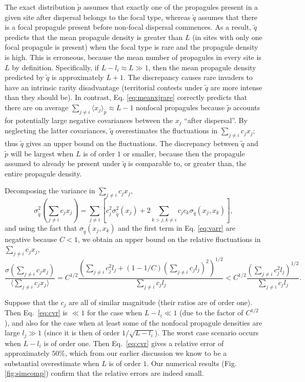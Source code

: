 \documentclass[12pt]{article}
\begin{document}
The exact distribution $\tilde{p}$ assumes that exactly one of the  propagules present in a given site after dispersal belongs to the focal type, whereas $\tilde{q}$ assumes that there is a focal propagule present before non-focal dispersal commences. As a result, $\tilde{q}$ predicts that the mean propagule density is greater than $L$ (in sites with only one focal propagule is present) when the focal type is rare and the propagule density is high. This is erroneous, because the mean number of propagules in every site is $L$ by definition. Specifically, if $L-l_i \approx L\gg 1$, then the mean propagule density predicted by $\tilde{q}$ is approximately $L+1$. The discrepancy causes rare invaders to have an intrinsic rarity disadvantage (territorial contests under $\tilde{q}$ are more intense than they should be). In contrast, Eq. \eqref{eq:meanxjrare} correctly predicts that there are on average $\sum_{j\neq i}\langle x_j \rangle_{\tilde{p}}\approx L-1$ nonfocal propagules because $\tilde{p}$ accounts for potentially large negative covariances between the $x_j$ ``after dispersal''. By neglecting the latter covariances, $\tilde{q}$ overestimates the fluctuations in $\sum_{j\neq i} c_j x_j$; thus $\tilde{q}$ gives an upper bound on the fluctuations. The discrepancy between $\tilde{q}$ and $\tilde{p}$ will be largest when $L$ is of order $1$ or smaller, because then the propagule assumed to already be present under $\tilde{q}$ is comparable to, or greater than, the entire propagule density. 

Decomposing the variance in $\sum_{j\neq i} c_j x_j$,
\begin{equation}
\sigma_{\tilde{q}}^2(\sum_{j\neq i} c_j x_j)=\sum_{j\neq i}\left[c_j^2\sigma_{\tilde{q}}^2(x_j)+2\sum_{k>j, k\neq i}c_j c_k\sigma_{\tilde{q}}(x_j,x_k)\right],\label{eq:vartotr}
\end{equation}
and using the fact that $\sigma_{\tilde{q}}(x_j,x_k)$ and the first term in Eq. \eqref{eq:varr} are negative because $C<1$, we obtain an upper bound on the relative fluctuations in $\sum_{j\neq i} c_j x_j$, 
\begin{equation}
\frac{\sigma(\sum_{j\neq i} c_j x_j)}{\langle\sum_{j\neq i} c_j x_j\rangle}=C^{1/2}\frac{\left(\sum_{j\neq i}c_j^2 l_j+(1-1/C)\left(\sum_{j\neq i}c_j l_j\right)^2 \right)^{1/2}}{\sum_{j\neq i}c_j l_j}<C^{1/2}\frac{\left(\sum_{j\neq i}c_j^2 l_j\right)^{1/2}}{\sum_{j\neq i}c_j l_j}. \label{eq:cvr}
\end{equation}

Suppose that the $c_j$ are all of similar magnitude (their ratios are of order one). Then Eq.~\eqref{eq:cvr} is $\ll 1$ for the case when $L-l_i \ll 1$ (due to the factor of $C^{1/2}$), and also for the case when at least some of the nonfocal propagule densities are large $l_j\gg 1$ (since it is then of order $1/\sqrt{L-l_i}$). The worst case scenario occurs when $L-l_i$ is of order one. Then Eq.~\eqref{eq:cvr} gives a relative error of approximately $50\%$, which from our earlier discussion we know to be a substantial overestimate when $L$ is of order $1$. Our numerical results (Fig. \ref{fig:simcomp}) confirm that the relative errors are indeed small.
\end{document}
